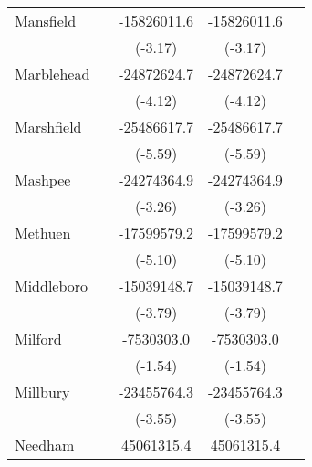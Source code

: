 {\begin{tabular}{l*{4}{c}}
\addlinespace
Mansfield           &                     & -15826011.6\sym{**} & -15826011.6\sym{**} &                     \\
                    &                     &     (-3.17)         &     (-3.17)         &                     \\
\addlinespace
Marblehead          &                     & -24872624.7\sym{***}& -24872624.7\sym{***}&                     \\
                    &                     &     (-4.12)         &     (-4.12)         &                     \\
\addlinespace
Marshfield          &                     & -25486617.7\sym{***}& -25486617.7\sym{***}&                     \\
                    &                     &     (-5.59)         &     (-5.59)         &                     \\
\addlinespace
Mashpee             &                     & -24274364.9\sym{**} & -24274364.9\sym{**} &                     \\
                    &                     &     (-3.26)         &     (-3.26)         &                     \\
\addlinespace
Methuen             &                     & -17599579.2\sym{***}& -17599579.2\sym{***}&                     \\
                    &                     &     (-5.10)         &     (-5.10)         &                     \\
\addlinespace
Middleboro          &                     & -15039148.7\sym{***}& -15039148.7\sym{***}&                     \\
                    &                     &     (-3.79)         &     (-3.79)         &                     \\
\addlinespace
Milford             &                     &  -7530303.0         &  -7530303.0         &                     \\
                    &                     &     (-1.54)         &     (-1.54)         &                     \\
\addlinespace
Millbury            &                     & -23455764.3\sym{***}& -23455764.3\sym{***}&                     \\
                    &                     &     (-3.55)         &     (-3.55)         &                     \\
\addlinespace
Needham             &                     &  45061315.4\sym{***}&  45061315.4\sym{***}&                     \\

\end{tabular}}
